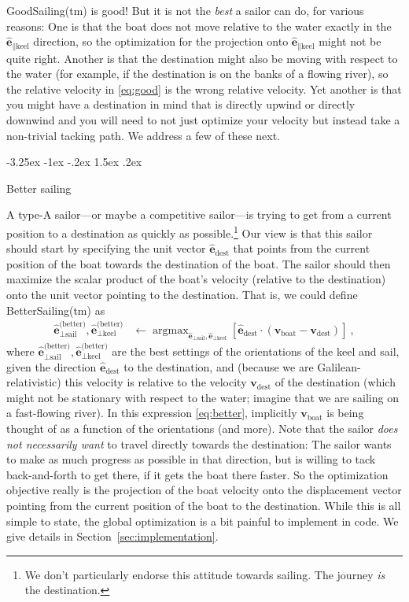 \documentclass[letterpaper]{article}
\makeatletter
\DeclareMathOperator*{\argmax}{argmax}
\renewcommand{\vec}[1]{\boldsymbol{#1}}
\newcommand{\uvec}{\vec{\hat{e}}}
\newcommand{\boat}{\text{boat}}
\newcommand{\destination}{\text{dest}}
\newcommand{\better}{\text{(better)}}
\newcommand{\sail}{\text{sail}}
\newcommand{\keel}{\text{keel}}
\newcommand{\vboat}{\vec{v}_\boat}
\newcommand{\vdest}{\vec{v}_\destination}
\newcommand{\secref}[1]{Section~\ref{#1}}
\renewcommand\section{\@startsection {section}{1}{\z@}%
  {-3.25ex \@plus -1ex \@minus -.2ex}%
  {1.5ex \@plus .2ex}%
  {\raggedright\normalfont\large\bfseries}}
\makeatother
\begin{document}
GoodSailing(tm) is good!
But it is not the \emph{best} a sailor can do, for various reasons:
One is that the boat does not move relative to the water exactly in the $\uvec_{\parallel\keel}$ direction, so the optimization for the projection onto $\uvec_{\parallel\keel}$ might not be quite right.
Another is that the destination might also be moving with respect to the water (for example, if the destination is on the banks of a flowing river), so the relative velocity in \eqref{eq:good} is the wrong relative velocity.
Yet another is that you might have a destination in mind that is directly upwind or directly downwind and you will need to not just optimize your velocity but instead take a non-trivial tacking path.
We address a few of these next.

\section{Better sailing}\label{sec:better}

A type-A sailor---or maybe a competitive sailor---is trying to get from a current position to a destination as quickly as possible.\footnote{%
We don't particularly endorse this attitude towards sailing. The journey \emph{is} the destination.}
Our view is that this sailor should start by specifying the unit vector $\uvec_\destination$ that points from the current position of the boat towards the destination of the boat.
The sailor should then maximize the scalar product of the boat's velocity (relative to the destination) onto the unit vector pointing to the destination.
That is, we could define BetterSailing(tm) as
\begin{align}\label{eq:better}
    \uvec_{\perp\sail}^\better,\uvec_{\perp\keel}^\better &\leftarrow \argmax_{\uvec_{\perp\sail},\uvec_{\perp\keel}} \left[\uvec_\destination\cdot(\vboat-\vdest)\right] ~,
\end{align}
where $\uvec_{\perp\sail}^\better,\uvec_{\perp\keel}^\better$ are the best settings of the orientations of the keel and sail, given the direction $\uvec_\destination$ to the destination, and (because we are Galilean-relativistic) this velocity is relative to the velocity $\vdest$ of the destination (which might not be stationary with respect to the water; imagine that we are sailing on a fast-flowing river).
In this expression \eqref{eq:better}, implicitly $\vboat$ is being thought of as a function of the orientations (and more).
Note that the sailor \emph{does not necessarily want} to travel directly towards the destination:
The sailor wants to make as much progress as possible in that direction, but is willing to tack back-and-forth to get there, if it gets the boat there faster.
So the optimization objective really is the projection of the boat velocity onto the displacement vector pointing from the current position of the boat to the destination.
While this is all simple to state, the global optimization is a bit painful to implement in code.
We give details in \secref{sec:implementation}.
\end{document}
